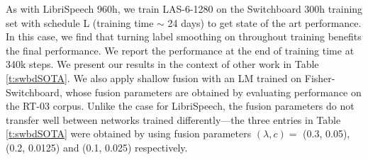 \documentclass[a4paper]{article}
\begin{document}
As with LibriSpeech 960h, we train LAS-6-1280 on the Switchboard 300h training set with schedule L (training time $\sim$ 24 days) to get state of the art performance. In this case, we find that turning label smoothing on throughout training benefits the final performance. We report the performance at the end of training time at 340k steps. We present our results in the context of other work in Table \ref{t:swbdSOTA}.  We also apply shallow fusion with an LM trained on Fisher-Switchboard, whose fusion parameters are obtained by evaluating performance on the RT-03 corpus. Unlike the case for LibriSpeech, the fusion parameters do not transfer well between networks trained differently---the three entries in Table \ref{t:swbdSOTA} were obtained by using fusion parameters $(\lambda, c) = $ (0.3, 0.05), (0.2, 0.0125) and (0.1, 0.025) respectively.
\end{document}
